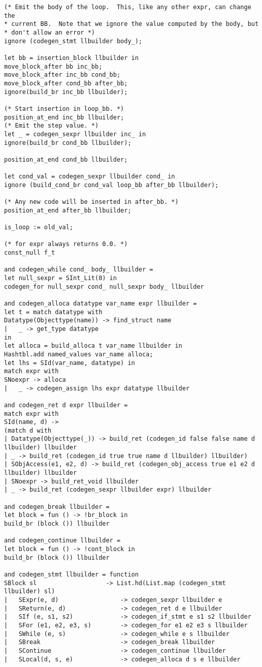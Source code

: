 \begin{verbatim}
(* Emit the body of the loop.  This, like any other expr, can change the
* current BB.  Note that we ignore the value computed by the body, but
* don't allow an error *)
ignore (codegen_stmt llbuilder body_);

let bb = insertion_block llbuilder in
move_block_after bb inc_bb;
move_block_after inc_bb cond_bb;
move_block_after cond_bb after_bb;
ignore(build_br inc_bb llbuilder);

(* Start insertion in loop_bb. *)
position_at_end inc_bb llbuilder;
(* Emit the step value. *)	
let _ = codegen_sexpr llbuilder inc_ in
ignore(build_br cond_bb llbuilder);

position_at_end cond_bb llbuilder;

let cond_val = codegen_sexpr llbuilder cond_ in
ignore (build_cond_br cond_val loop_bb after_bb llbuilder);

(* Any new code will be inserted in after_bb. *)
position_at_end after_bb llbuilder;

is_loop := old_val;

(* for expr always returns 0.0. *)
const_null f_t

and codegen_while cond_ body_ llbuilder = 
let null_sexpr = SInt_Lit(0) in
codegen_for null_sexpr cond_ null_sexpr body_ llbuilder

and codegen_alloca datatype var_name expr llbuilder = 
let t = match datatype with 
Datatype(Objecttype(name)) -> find_struct name
|  	_ -> get_type datatype
in
let alloca = build_alloca t var_name llbuilder in
Hashtbl.add named_values var_name alloca;
let lhs = SId(var_name, datatype) in
match expr with 
SNoexpr -> alloca
|  	_ -> codegen_assign lhs expr datatype llbuilder

and codegen_ret d expr llbuilder =  
match expr with
SId(name, d) ->
(match d with 
| Datatype(Objecttype(_)) -> build_ret (codegen_id false false name d llbuilder) llbuilder
| _ -> build_ret (codegen_id true true name d llbuilder) llbuilder)
| SObjAccess(e1, e2, d) -> build_ret (codegen_obj_access true e1 e2 d llbuilder) llbuilder
| SNoexpr -> build_ret_void llbuilder
| _ -> build_ret (codegen_sexpr llbuilder expr) llbuilder

and codegen_break llbuilder = 
let block = fun () -> !br_block in
build_br (block ()) llbuilder

and codegen_continue llbuilder = 
let block = fun () -> !cont_block in
build_br (block ()) llbuilder

and codegen_stmt llbuilder = function
SBlock sl        			-> List.hd(List.map (codegen_stmt llbuilder) sl)
|   SExpr(e, d)          		-> codegen_sexpr llbuilder e
|   SReturn(e, d)    			-> codegen_ret d e llbuilder
|   SIf (e, s1, s2)       		-> codegen_if_stmt e s1 s2 llbuilder
|   SFor (e1, e2, e3, s)  		-> codegen_for e1 e2 e3 s llbuilder
|   SWhile (e, s)    			-> codegen_while e s llbuilder
|   SBreak           			-> codegen_break llbuilder   
|   SContinue        			-> codegen_continue llbuilder
|   SLocal(d, s, e)  			-> codegen_alloca d s e llbuilder


\end{verbatim}

